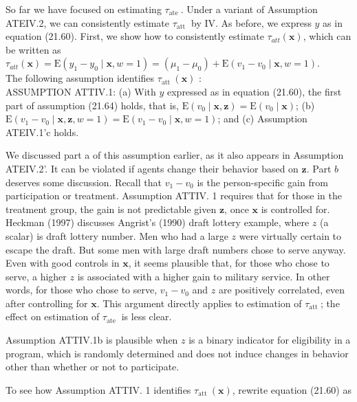 \documentclass[10pt]{article}
\begin{document}
So far we have focused on estimating $\tau_{\text {ate }}$. Under a variant of Assumption ATEIV.2, we can consistently estimate $\tau_{\text {att }}$ by IV. As before, we express $y$ as in equation (21.60). First, we show how to consistently estimate $\tau_{a t t}(\mathbf{x})$, which can be written as\\
$\tau_{a t t}(\mathbf{x})=\mathrm{E}\left(y_{1}-y_{0} \mid \mathbf{x}, w=1\right)=\left(\mu_{1}-\mu_{0}\right)+\mathrm{E}\left(v_{1}-v_{0} \mid \mathbf{x}, w=1\right)$.\\
The following assumption identifies $\tau_{\text {att }}(\mathbf{x})$ :\\
ASSUMPTION ATTIV.1: (a) With $y$ expressed as in equation (21.60), the first part of assumption (21.64) holds, that is, $\mathrm{E}\left(v_{0} \mid \mathbf{x}, \mathbf{z}\right)=\mathrm{E}\left(v_{0} \mid \mathbf{x}\right)$; (b) $\mathrm{E}\left(v_{1}-v_{0} \mid \mathbf{x}, \mathbf{z}, w=1\right)= \mathrm{E}\left(v_{1}-v_{0} \mid \mathbf{x}, w=1\right)$; and (c) Assumption ATEIV.1'c holds.

We discussed part a of this assumption earlier, as it also appears in Assumption ATEIV.2'. It can be violated if agents change their behavior based on $\mathbf{z}$. Part $b$ deserves some discussion. Recall that $v_{1}-v_{0}$ is the person-specific gain from participation or treatment. Assumption ATTIV. 1 requires that for those in the treatment group, the gain is not predictable given $\mathbf{z}$, once $\mathbf{x}$ is controlled for. Heckman (1997) discusses Angrist's (1990) draft lottery example, where $z$ (a scalar) is draft lottery number. Men who had a large $z$ were virtually certain to escape the draft. But some men with large draft numbers chose to serve anyway. Even with good controls in $\mathbf{x}$, it seems plausible that, for those who chose to serve, a higher $z$ is associated with a higher gain to military service. In other words, for those who chose to serve, $v_{1}-v_{0}$ and $z$ are positively correlated, even after controlling for $\mathbf{x}$. This argument directly applies to estimation of $\tau_{\text {att }}$; the effect on estimation of $\tau_{\text {ate }}$ is less clear.

Assumption ATTIV.1b is plausible when $z$ is a binary indicator for eligibility in a program, which is randomly determined and does not induce changes in behavior other than whether or not to participate.

To see how Assumption ATTIV. 1 identifies $\tau_{\text {att }}(\mathbf{x})$, rewrite equation (21.60) as
\end{document}
